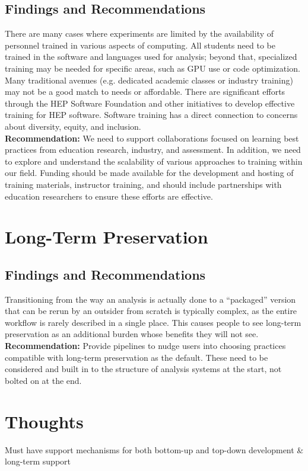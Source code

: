 \subsection{Findings and Recommendations}
There are many cases where experiments are limited by the availability of personnel trained in various aspects of computing. All students need to be trained in the software and languages used for analysis; beyond that, specialized training may be needed for specific areas, such as GPU use or code optimization. Many traditional avenues (e.g. dedicated academic classes or industry training) may not be a good match to needs or affordable. There are significant efforts through the HEP Software Foundation and other initiatives to develop effective training for HEP software. Software training has a direct connection to concerns about diversity, equity, and inclusion.\\
\textbf{Recommendation:}  We need to support collaborations focused on learning best practices from education research, industry, and assessment. In addition, we need to explore and understand the scalability of various approaches to training within our field.  Funding should be made available for the development and hosting of training materials, instructor training, and should include partnerships with education researchers to ensure these efforts are effective.

\section{Long-Term Preservation}
\subsection{Findings and Recommendations}
Transitioning from the way an analysis is actually done to a “packaged” version that can be rerun by an outsider from scratch is typically complex, as the entire workflow is rarely described in a single place. This causes people to see long-term preservation as an additional burden whose benefits they will not see.\\
\textbf{Recommendation:} Provide pipelines to nudge users into choosing practices compatible with long-term preservation as the default. These need to be considered and built in to the structure of analysis systems at the start, not bolted on at the end.

\section{Thoughts}
Must have support mechanisms for both bottom-up and top-down development \& long-term support

